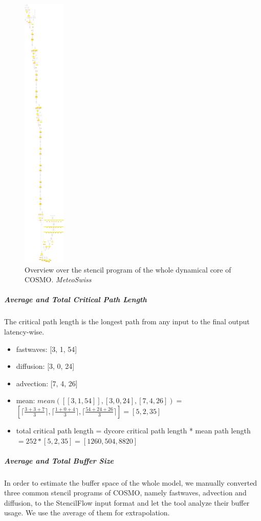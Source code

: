 \begin{figure}[h]
	\centering
	\includegraphics[height=36em]{drawings/dycore-overview.png}
	\caption{Overview over the stencil program of the whole dynamical core of COSMO. \textit{MeteoSwiss}}
	\label{fig:dycore-overview}
\end{figure}


\subparagraph{Average and Total Critical Path Length}  
The critical path length is the longest path from any input to the final output latency-wise.
\begin{itemize}
	\item fastwaves: [3, 1, 54]
	\item diffusion: [3, 0, 24]
	\item advection: [7, 4, 26]
	\item mean: $mean([[3, 1, 54]], [3, 0, 24], [7, 4, 26]) =$\\
	$ [\lceil\frac{3 + 3 + 7}{3}\rceil, \lceil\frac{1 + 0 + 4}{3}\rceil, \lceil\frac{54 + 24 + 26}{3}\rceil] = [5, 2, 35]$
	\item total critical path length = dycore critical path length * mean path length $ = 252 * [5, 2, 35] = [1260, 504, 8820]$
\end{itemize}


\subparagraph{Average and Total Buffer Size}
In order to estimate the buffer space of the whole model, we manually converted three common stencil programs of COSMO, namely fastwaves, advection and diffusion, to the StencilFlow input format and let the tool analyze their buffer usage. We use the average of them for extrapolation.

